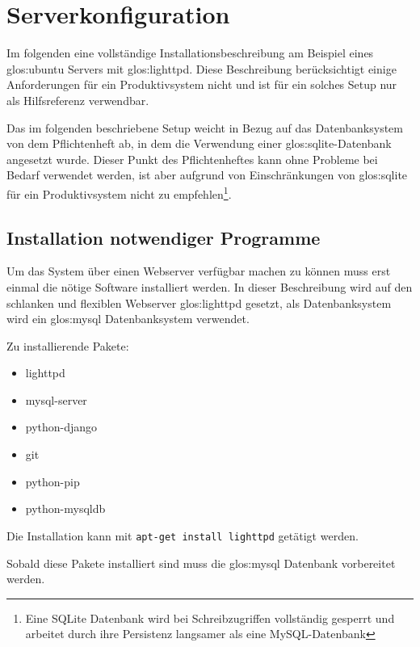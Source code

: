 \chapter{Serverkonfiguration}
Im folgenden eine vollständige Installationsbeschreibung am Beispiel eines
\Gls{glos:ubuntu} Servers mit \Gls{glos:lighttpd}. Diese
Beschreibung berücksichtigt einige Anforderungen für ein Produktivsystem nicht
und ist für ein solches Setup nur als Hilfsreferenz verwendbar. 

Das im folgenden beschriebene Setup weicht in Bezug auf das Datenbanksystem von
dem Pflichtenheft ab, in dem die Verwendung einer \Gls{glos:sqlite}-Datenbank
angesetzt wurde. Dieser Punkt des Pflichtenheftes kann ohne Probleme bei Bedarf
verwendet werden, ist aber aufgrund von Einschränkungen von \Gls{glos:sqlite}
für ein Produktivsystem nicht zu empfehlen\footnote{Eine SQLite Datenbank wird
bei Schreibzugriffen vollständig gesperrt und arbeitet durch ihre Persistenz
langsamer als eine MySQL-Datenbank}.

\section{Installation notwendiger Programme}
Um das System über einen Webserver verfügbar machen zu können muss erst einmal
die nötige Software installiert werden. In dieser Beschreibung wird auf den
schlanken und flexiblen Webserver \Gls{glos:lighttpd} gesetzt, als
Datenbanksystem wird ein \Gls{glos:mysql} Datenbanksystem verwendet.

Zu installierende Pakete:
\begin{itemize}
  \item lighttpd
  \item mysql-server
  \item python-django
  \item git
  \item python-pip
  \item python-mysqldb
\end{itemize}
Die Installation kann mit \zB \lstinline{apt-get install lighttpd} getätigt
werden.

Sobald diese Pakete installiert sind muss die \Gls{glos:mysql} Datenbank
vorbereitet werden.

